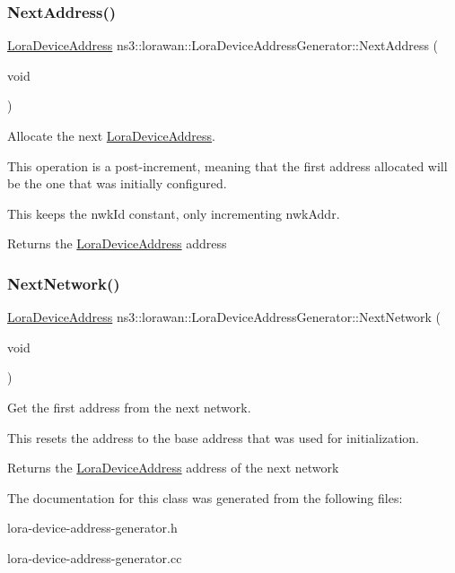 \subsubsection{\texorpdfstring{Next\+Address()}{NextAddress()}}
{\footnotesize\ttfamily \hyperlink{classns3_1_1lorawan_1_1LoraDeviceAddress}{Lora\+Device\+Address} ns3\+::lorawan\+::\+Lora\+Device\+Address\+Generator\+::\+Next\+Address (\begin{DoxyParamCaption}\item[{void}]{ }\end{DoxyParamCaption})}

Allocate the next \hyperlink{classns3_1_1lorawan_1_1LoraDeviceAddress}{Lora\+Device\+Address}.

This operation is a post-\/increment, meaning that the first address allocated will be the one that was initially configured.

This keeps the nwk\+Id constant, only incrementing nwk\+Addr.

\begin{DoxyReturn}{Returns}
the \hyperlink{classns3_1_1lorawan_1_1LoraDeviceAddress}{Lora\+Device\+Address} address 
\end{DoxyReturn}
\mbox{\label{classns3_1_1lorawan_1_1LoraDeviceAddressGenerator_a2d166ee5b76365d6a7a31cac36817f60}} 
\subsubsection{\texorpdfstring{Next\+Network()}{NextNetwork()}}
{\footnotesize\ttfamily \hyperlink{classns3_1_1lorawan_1_1LoraDeviceAddress}{Lora\+Device\+Address} ns3\+::lorawan\+::\+Lora\+Device\+Address\+Generator\+::\+Next\+Network (\begin{DoxyParamCaption}\item[{void}]{ }\end{DoxyParamCaption})}

Get the first address from the next network.

This resets the address to the base address that was used for initialization.

\begin{DoxyReturn}{Returns}
the \hyperlink{classns3_1_1lorawan_1_1LoraDeviceAddress}{Lora\+Device\+Address} address of the next network 
\end{DoxyReturn}


The documentation for this class was generated from the following files\+:\begin{DoxyCompactItemize}
\item 
lora-\/device-\/address-\/generator.\+h\item 
lora-\/device-\/address-\/generator.\+cc\end{DoxyCompactItemize}
